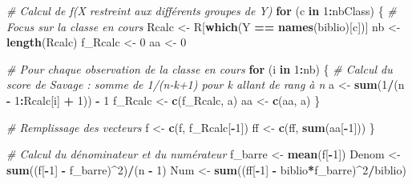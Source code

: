 \documentclass[
  12pt,
]{article}
\newenvironment{Shaded}{\begin{snugshade}}{\end{snugshade}}
\newcommand{\CommentTok}[1]{\textcolor[rgb]{0.56,0.35,0.01}{\textit{#1}}}
\newcommand{\ControlFlowTok}[1]{\textcolor[rgb]{0.13,0.29,0.53}{\textbf{#1}}}
\newcommand{\DecValTok}[1]{\textcolor[rgb]{0.00,0.00,0.81}{#1}}
\newcommand{\FunctionTok}[1]{\textcolor[rgb]{0.13,0.29,0.53}{\textbf{#1}}}
\newcommand{\NormalTok}[1]{#1}
\newcommand{\OtherTok}[1]{\textcolor[rgb]{0.56,0.35,0.01}{#1}}
\newcommand{\SpecialCharTok}[1]{\textcolor[rgb]{0.81,0.36,0.00}{\textbf{#1}}}
\begin{document}
\begin{Shaded}
\begin{Highlighting}[]
  \CommentTok{\# Calcul de f(X restreint aux différents groupes de Y)}
  \ControlFlowTok{for}\NormalTok{ (c }\ControlFlowTok{in} \DecValTok{1}\SpecialCharTok{:}\NormalTok{nbClass) \{}
    \CommentTok{\# Focus sur la classe en cours}
\NormalTok{    Rcalc }\OtherTok{\textless{}{-}}\NormalTok{ R[}\FunctionTok{which}\NormalTok{(Y }\SpecialCharTok{==} \FunctionTok{names}\NormalTok{(biblio)[c])]}
\NormalTok{    nb }\OtherTok{\textless{}{-}} \FunctionTok{length}\NormalTok{(Rcalc)}
\NormalTok{    f\_Rcalc }\OtherTok{\textless{}{-}} \DecValTok{0}
\NormalTok{    aa }\OtherTok{\textless{}{-}} \DecValTok{0}
    
    \CommentTok{\# Pour chaque observation de la classe en cours}
    \ControlFlowTok{for}\NormalTok{ (i }\ControlFlowTok{in} \DecValTok{1}\SpecialCharTok{:}\NormalTok{nb) \{}
      \CommentTok{\# Calcul du score de Savage : somme de 1/(n{-}k+1) pour k allant de rang à n}
\NormalTok{      a }\OtherTok{\textless{}{-}} \FunctionTok{sum}\NormalTok{(}\DecValTok{1}\SpecialCharTok{/}\NormalTok{(n }\SpecialCharTok{{-}} \DecValTok{1}\SpecialCharTok{:}\NormalTok{Rcalc[i] }\SpecialCharTok{+} \DecValTok{1}\NormalTok{)) }\SpecialCharTok{{-}} \DecValTok{1}
\NormalTok{      f\_Rcalc }\OtherTok{\textless{}{-}} \FunctionTok{c}\NormalTok{(f\_Rcalc, a)}
\NormalTok{      aa }\OtherTok{\textless{}{-}} \FunctionTok{c}\NormalTok{(aa, a)}
\NormalTok{    \}}
    
    \CommentTok{\# Remplissage des vecteurs}
\NormalTok{    f }\OtherTok{\textless{}{-}} \FunctionTok{c}\NormalTok{(f, f\_Rcalc[}\SpecialCharTok{{-}}\DecValTok{1}\NormalTok{])}
\NormalTok{    ff }\OtherTok{\textless{}{-}} \FunctionTok{c}\NormalTok{(ff, }\FunctionTok{sum}\NormalTok{(aa[}\SpecialCharTok{{-}}\DecValTok{1}\NormalTok{]))}
\NormalTok{  \}}
  
  \CommentTok{\# Calcul du dénominateur et du numérateur}
\NormalTok{  f\_barre }\OtherTok{\textless{}{-}} \FunctionTok{mean}\NormalTok{(f[}\SpecialCharTok{{-}}\DecValTok{1}\NormalTok{])}
\NormalTok{  Denom }\OtherTok{\textless{}{-}} \FunctionTok{sum}\NormalTok{((f[}\SpecialCharTok{{-}}\DecValTok{1}\NormalTok{] }\SpecialCharTok{{-}}\NormalTok{ f\_barre)}\SpecialCharTok{\^{}}\DecValTok{2}\NormalTok{)}\SpecialCharTok{/}\NormalTok{(n }\SpecialCharTok{{-}} \DecValTok{1}\NormalTok{)}
\NormalTok{  Num }\OtherTok{\textless{}{-}} \FunctionTok{sum}\NormalTok{((ff[}\SpecialCharTok{{-}}\DecValTok{1}\NormalTok{] }\SpecialCharTok{{-}}\NormalTok{ biblio}\SpecialCharTok{*}\NormalTok{f\_barre)}\SpecialCharTok{\^{}}\DecValTok{2}\SpecialCharTok{/}\NormalTok{biblio)}
  

\end{Highlighting}
\end{Shaded}
\end{document}
